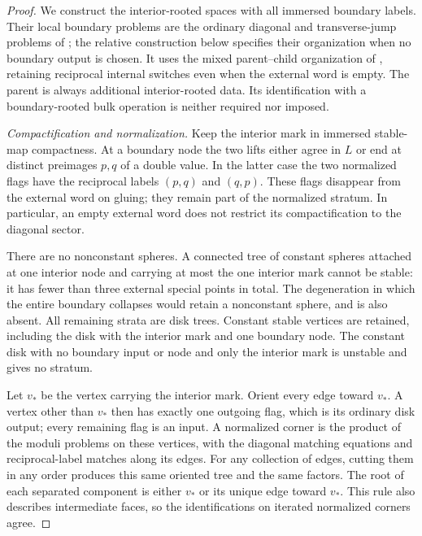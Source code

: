 \documentclass[11pt]{article}
\numberwithin{equation}{section}
\theoremstyle{definition}
\theoremstyle{remark}
\begin{document}
\begin{proof}
We construct the interior-rooted spaces with all immersed boundary
labels.  Their local boundary problems are the ordinary diagonal and
transverse-jump problems of \cite[Sections~4--5]{Floer:AJ}; the
relative construction below specifies their organization when no
boundary output is chosen.  It uses the mixed parent--child
organization of \cite[Propositions~16.3 and~16.14]{Floer:AFOOO2026}, retaining
reciprocal internal switches even when the external word is empty.
The parent is always additional interior-rooted data.  Its
identification with a boundary-rooted bulk operation is neither
required nor imposed.

\emph{Compactification and normalization.}
Keep the interior mark in immersed stable-map compactness.  At a
boundary node the two lifts either agree in $L$ or end at distinct
preimages $p,q$ of a double value.  In the latter case the two
normalized flags have the reciprocal labels $(p,q)$ and $(q,p)$.
These flags disappear from the external word on gluing; they remain
part of the normalized stratum.  In particular, an empty external
word does not restrict its compactification to the diagonal sector.

There are no nonconstant spheres.  A connected tree of constant
spheres attached at one interior node and carrying at most the one
interior mark cannot be stable: it has fewer than three external
special points in total.  The degeneration in which the entire
boundary collapses would retain a nonconstant sphere, and is also
absent.  All remaining strata are disk trees.  Constant stable
vertices are retained, including the disk with the interior mark
and one boundary node.  The constant disk with no boundary input or
node and only the interior mark is unstable and gives no stratum.

Let $v_*$ be the vertex carrying the interior mark.  Orient every
edge toward $v_*$.  A vertex other than $v_*$ then has exactly one
outgoing flag, which is its ordinary disk output; every remaining
flag is an input.  A normalized corner is the product of the moduli
problems on these vertices, with the diagonal matching equations
and reciprocal-label matches along its edges.  For any collection
of edges, cutting them in any order produces this same oriented
tree and the same factors.  The root of each separated component
is either $v_*$ or its unique edge toward $v_*$.  This rule also
describes intermediate faces, so the identifications on iterated
normalized corners agree.


\end{proof}
\end{document}
